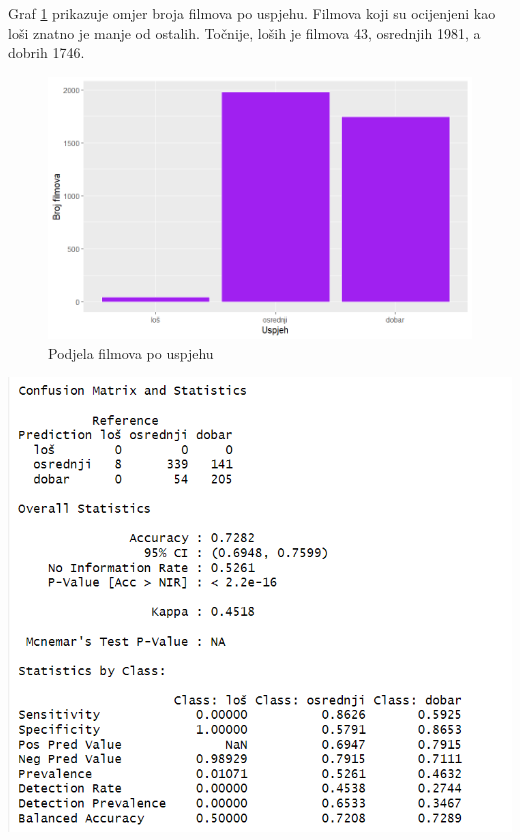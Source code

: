 Graf \ref{fig:ml1} prikazuje omjer broja filmova po uspjehu. Filmova koji su ocijenjeni kao loši znatno je manje od ostalih. Točnije, loših je filmova 43, osrednjih 1981, a dobrih 1746.

\begin{figure}
	\centering
	\includegraphics[width=15cm]{../figures/expl/001.png}
	\caption{Podjela filmova po uspjehu}
	\label{fig:ml1}
\end{figure}




\begin{center}
	\includegraphics{../figures/expl/002.png}
\end{center}


